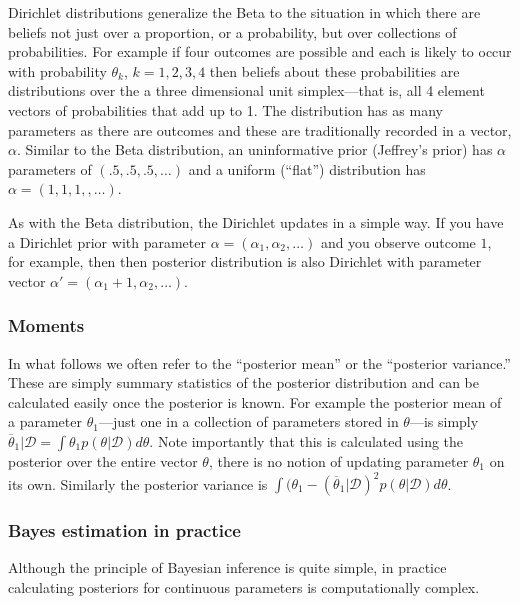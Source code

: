 \documentclass[12pt,]{book}
\begin{document}
Dirichlet distributions generalize the Beta to the situation in which there are beliefs not just over a proportion, or a probability, but over collections of probabilities. For example if four outcomes are possible and each is likely to occur with probability \(\theta_k\), \(k=1,2,3,4\) then beliefs about these probabilities are distributions over the a three dimensional unit simplex---that is, all 4 element vectors of probabilities that add up to 1. The distribution has as many parameters as there are outcomes and these are traditionally recorded in a vector, \(\alpha\). Similar to the Beta distribution, an uninformative prior (Jeffrey's prior) has \(\alpha\) parameters of \((.5,.5,.5, \dots)\) and a uniform (``flat'') distribution has \(\alpha = (1,1,1,,\dots)\).

As with the Beta distribution, the Dirichlet updates in a simple way. If you have a Dirichlet prior with parameter \(\alpha = (\alpha_1, \alpha_2, \dots)\) and you observe outcome \(1\), for example, then then posterior distribution is also Dirichlet with parameter vector \(\alpha' = (\alpha_1+1, \alpha_2,\dots)\).

\hypertarget{moments}{%
\subsubsection{Moments}\label{moments}}

In what follows we often refer to the ``posterior mean'' or the ``posterior variance.'' These are simply summary statistics of the posterior distribution and can be calculated easily once the posterior is known. For example the posterior mean of a parameter \(\theta_1\)---just one in a collection of parameters stored in \(\theta\)---is simply \(\overline{\theta}_1 | \mathcal{D} = \int \theta_1 p(\theta | \mathcal{D}) d\theta\). Note importantly that this is calculated using the posterior over the entire vector \(\theta\), there is no notion of updating parameter \(\theta_1\) on its own. Similarly the posterior variance is \(\int (\theta_1 - (\overline{\theta}_1 | \mathcal{D})^2 p(\theta | \mathcal{D}) d\theta\).

\hypertarget{bayes-estimation-in-practice}{%
\subsubsection{Bayes estimation in practice}\label{bayes-estimation-in-practice}}

Although the principle of Bayesian inference is quite simple, in practice calculating posteriors for continuous parameters is computationally complex.
\end{document}
